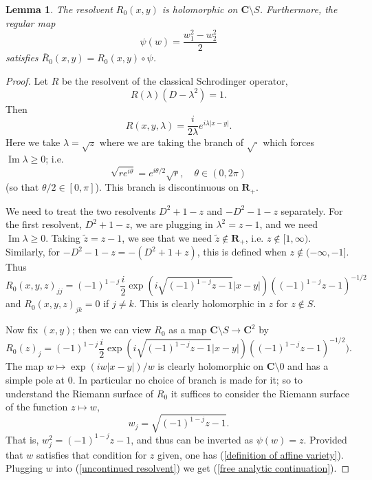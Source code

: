 \documentclass[reqno,12pt,letterpaper]{amsart}
\newcommand{\RR}{\mathbf{R}}
\newcommand{\CC}{\mathbf{C}}
\renewcommand{\Im}{\operatorname{Im}}
\newtheorem{lemma}[theorem]{Lemma}
\theoremstyle{definition}
\begin{document}
\begin{lemma}
The resolvent $R_0(x, y)$ is holomorphic on $\CC \setminus S$.
Furthermore, the regular map
\begin{equation}
\label{recovering the standard branch}
\psi(w) = \frac{w_1^2 - w_2^2}{2}
\end{equation}
satisfies $\overline R_0(x, y) = R_0(x, y) \circ \psi$.
\end{lemma}
\begin{proof}
Let $R$ be the resolvent of the classical Schrodinger operator,
$$R(\lambda)(D - \lambda^2) = 1.$$
Then
$$R(x, y, \lambda) = \frac{i}{2\lambda} e^{i\lambda|x-y|}.$$
Here we take $\lambda = \sqrt z$ where we are taking the branch of $\sqrt\cdot$ which forces $\Im \lambda \geq 0$; i.e.
$$\sqrt{re^{i\theta}} = e^{i\theta/2}\sqrt r,\quad \theta \in (0, 2\pi)$$
(so that $\theta/2 \in [0, \pi]$). This branch is discontinuous on $\RR_+$.

We need to treat the two resolvents $D^2 + 1 - z$ and $-D^2 - 1 - z$ separately.
For the first resolvent, $D^2 + 1 - z$, we are plugging in $\lambda^2 = z - 1$, and we need $\Im \lambda \geq 0$.
Taking $\widetilde z = z - 1$, we see that we need $\widetilde z \notin \RR_+$, i.e. $z \notin [1, \infty)$.
Similarly, for $-D^2 - 1 - z = -(D^2 + 1 + z)$, this is defined when $z \notin (-\infty, -1]$. Thus
\begin{equation}
\label{uncontinued resolvent}
R_0(x, y, z)_{jj} = (-1)^{1-j}\frac{i}{2} \exp(i\sqrt{(-1)^{1-j}z -1}|x-y|)((-1)^{1-j}z -1)^{-1/2}
\end{equation}
and $R_0(x,y,z)_{jk} = 0$ if $j \neq k$.
This is clearly holomorphic in $z$ for $z \notin S$.

Now fix $(x, y)$; then we can view $R_0$ as a map $\CC \setminus S \to \CC^2$ by
$$R_0(z)_j = (-1)^{1-j} \frac{i}{2} \exp(i\sqrt{(-1)^{1-j}z -1}|x-y|)((-1)^{1-j}z -1)^{-1/2}).$$
The map $w \mapsto \exp(iw|x-y|)/w$ is clearly holomorphic on $\CC \setminus 0$ and has a simple pole at $0$.
In particular no choice of branch is made for it; so to understand the Riemann surface of $R_0$ it suffices to consider the Riemann surface of the function $z \mapsto w$,
$$w_j = \sqrt{(-1)^{1-j}z-1}.$$
That is, $w_j^2 = (-1)^{1-j}z - 1$, and thus can be inverted as $\psi(w) = z$.
Provided that $w$ satisfies that condition for $z$ given, one has (\ref{definition of affine variety}).
Plugging $w$ into (\ref{uncontinued resolvent}) we get (\ref{free analytic continuation}).
\end{proof}
\end{document}
